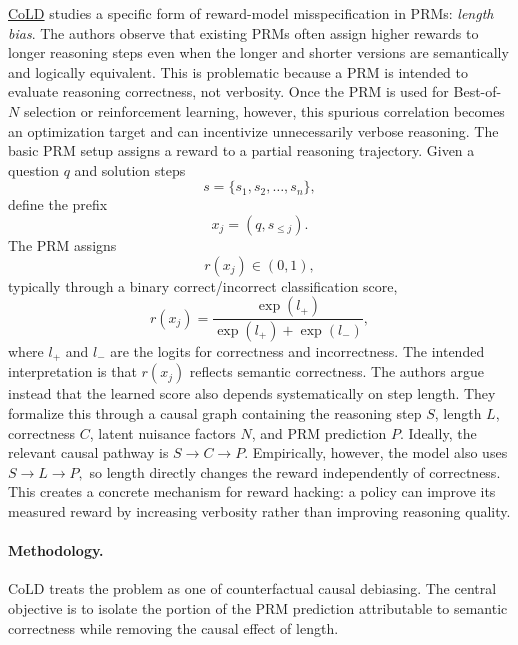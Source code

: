\documentclass[11pt]{article}
\begin{document}
\href{https://arxiv.org/abs/2507.15698}{CoLD} studies a specific form of reward-model misspecification in PRMs: \emph{length bias}. The authors observe that existing PRMs often assign higher rewards to longer reasoning steps even when the longer and shorter versions are semantically and logically equivalent. This is problematic because a PRM is intended to evaluate reasoning correctness, not verbosity. Once the PRM is used for Best-of-$N$ selection or reinforcement learning, however, this spurious correlation becomes an optimization target and can incentivize unnecessarily verbose reasoning.
The basic PRM setup assigns a reward to a partial reasoning trajectory. Given a question $q$ and solution steps
\[
s=\{s_1,s_2,\ldots,s_n\},
\]
define the prefix
\[
x_j=(q,s_{\leq j}).
\]
The PRM assigns
\[
r(x_j)\in(0,1),
\]
typically through a binary correct/incorrect classification score,
\[
r(x_j)
=
\frac{\exp(l_+)}
{\exp(l_+)+\exp(l_-)},
\]
where $l_+$ and $l_-$ are the logits for correctness and incorrectness.
The intended interpretation is that $r(x_j)$ reflects semantic correctness. The authors argue instead that the learned score also depends systematically on step length. They formalize this through a causal graph containing the reasoning step $S$, length $L$, correctness $C$, latent nuisance factors $N$, and PRM prediction $P$. Ideally, the relevant causal pathway is
$
S \rightarrow C \rightarrow P.
$
Empirically, however, the model also uses
$
S \rightarrow L \rightarrow P,
$
so length directly changes the reward independently of correctness. This creates a concrete mechanism for reward hacking: a policy can improve its measured reward by increasing verbosity rather than improving reasoning quality.

\paragraph{Methodology.}
CoLD treats the problem as one of counterfactual causal debiasing. The central objective is to isolate the portion of the PRM prediction attributable to semantic correctness while removing the causal effect of length.
\end{document}
